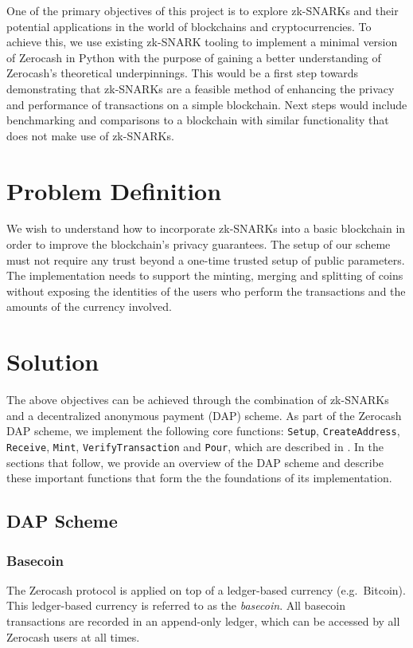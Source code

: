 \documentclass{article}
\begin{document}
One of the primary objectives of this project is to explore zk-SNARKs and their potential applications in the world of blockchains and cryptocurrencies. To achieve this, we use existing zk-SNARK tooling to implement a minimal version of Zerocash in Python with the purpose of gaining a better understanding of Zerocash's theoretical underpinnings. This would be a first step towards demonstrating that zk-SNARKs are a feasible method of enhancing the privacy and performance of transactions on a simple blockchain. Next steps would include benchmarking and comparisons to a blockchain with similar functionality that does not make use of zk-SNARKs.

\section{Problem Definition}
We wish to understand how to incorporate zk-SNARKs into a basic blockchain in order to improve the blockchain's privacy guarantees. The setup of our scheme must not require any trust beyond a one-time trusted setup of public parameters. The implementation needs to support the minting, merging and splitting of coins without exposing the identities of the users who perform the transactions and the amounts of the currency involved.

\section{Solution}
The above objectives can be achieved through the combination of zk-SNARKs and a decentralized anonymous payment (DAP) scheme. As part of the Zerocash DAP scheme, we implement the following core functions: \texttt{Setup}, \texttt{CreateAddress}, \texttt{Receive}, \texttt{Mint}, \texttt{VerifyTransaction} and \texttt{Pour}, which are described in \cite{zerocash}. In the sections that follow, we provide an overview of the DAP scheme and describe these important functions that form the the foundations of its implementation.

\subsection{DAP Scheme}
\subsubsection{Basecoin}
The Zerocash protocol is applied on top of a ledger-based currency (e.g.\ Bitcoin). This ledger-based currency is referred to as the \emph{basecoin}. All basecoin transactions are recorded in an append-only ledger, which can be accessed by all Zerocash users at all times.
\end{document}
